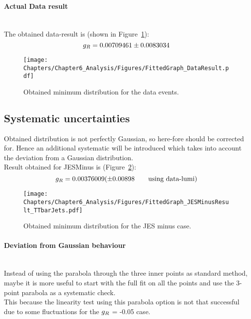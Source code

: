 \paragraph{Actual Data result} \hfill \\

The obtained data-result is (shown in Figure~\ref{fig::MinData}):
\begin{equation}
 g_{R} = 0.00709461 \pm 0.0083034
\end{equation}

\begin{figure}[h!t]
 \centering
 \texttt{[image: Chapters/Chapter6\_Analysis/Figures/FittedGraph\_DataResult.pdf]}
 \caption{Obtained minimum distribution for the data events.} \label{fig::MinData}
\end{figure}


\subsection{Systematic uncertainties}

Obtained distribution is not perfectly Gaussian, so here-fore should be corrected for.
Hence an additional systematic will be introduced which takes into account the deviation from a Gaussian distribution.
\\

Result obtained for JESMinus is (Figure~\ref{fig::MinJESMinus}):
\begin{equation}
 g_{R} = 0.00376009 (\pm 0.00898 \qquad \textrm{using data-lumi})
\end{equation}

\begin{figure}[h!t]
 \centering
 \texttt{[image: Chapters/Chapter6\_Analysis/Figures/FittedGraph\_JESMinusResult\_TTbarJets.pdf]}
 \caption{Obtained minimum distribution for the JES minus case.} \label{fig::MinJESMinus}
\end{figure}

\paragraph{Deviation from Gaussian behaviour} \hfill \\
Instead of using the parabola through the three inner points as standard method, maybe it is more useful to start with the full fit on all the points and use the 3-point parabola as a systematic check.
\\
This because the linearity test using this parabola option is not that successful due to some fluctuations for the $g_{R}$ = -0.05 case. 

